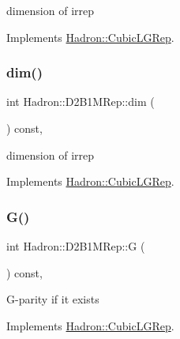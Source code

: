 dimension of irrep 

Implements \mbox{\hyperlink{structHadron_1_1CubicLGRep_a3acbaea26503ed64f20df693a48e4cdd}{Hadron\+::\+Cubic\+L\+G\+Rep}}.

\mbox{\label{structHadron_1_1D2B1MRep_a8d1c9f35b426e8848c73fa423f4f2a4b}} 
\subsubsection{\texorpdfstring{dim()}{dim()}\hspace{0.1cm}{\footnotesize\ttfamily [3/3]}}
{\footnotesize\ttfamily int Hadron\+::\+D2\+B1\+M\+Rep\+::dim (\begin{DoxyParamCaption}{ }\end{DoxyParamCaption}) const\hspace{0.3cm}{\ttfamily [inline]}, {\ttfamily [virtual]}}

dimension of irrep 

Implements \mbox{\hyperlink{structHadron_1_1CubicLGRep_a3acbaea26503ed64f20df693a48e4cdd}{Hadron\+::\+Cubic\+L\+G\+Rep}}.

\mbox{\label{structHadron_1_1D2B1MRep_abc6ac4ea31c661443bb658c8508bf378}} 
\subsubsection{\texorpdfstring{G()}{G()}\hspace{0.1cm}{\footnotesize\ttfamily [1/3]}}
{\footnotesize\ttfamily int Hadron\+::\+D2\+B1\+M\+Rep\+::G (\begin{DoxyParamCaption}{ }\end{DoxyParamCaption}) const\hspace{0.3cm}{\ttfamily [inline]}, {\ttfamily [virtual]}}

G-\/parity if it exists 

Implements \mbox{\hyperlink{structHadron_1_1CubicLGRep_ace26f7b2d55e3a668a14cb9026da5231}{Hadron\+::\+Cubic\+L\+G\+Rep}}.

\mbox{\label{structHadron_1_1D2B1MRep_abc6ac4ea31c661443bb658c8508bf378}} 
